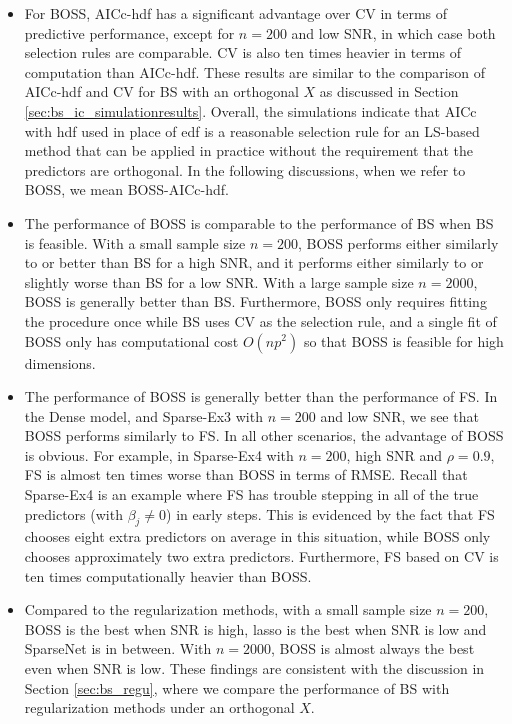 \begin{itemize}
	\item For BOSS, AICc-hdf has a significant advantage over CV in terms of predictive performance, except for $n=200$ and low SNR, in which case both selection rules are comparable. CV is also ten times heavier in terms of computation than AICc-hdf. These results are similar to the comparison of AICc-hdf and CV for BS with an orthogonal $X$ as discussed in Section \ref{sec:bs_ic_simulationresults}. Overall, the simulations indicate that AICc with hdf used in place of edf is a reasonable selection rule for an LS-based method that can be applied in practice without the requirement that the predictors are orthogonal. In the following discussions, when we refer to BOSS, we mean BOSS-AICc-hdf. 

	\item The performance of BOSS is comparable to the performance of BS when BS is feasible. With a small sample size $n=200$, BOSS performs either similarly to or better than BS for a high SNR, and it performs either similarly to or slightly worse than BS for a low SNR. With a large sample size $n=2000$, BOSS is generally better than BS. Furthermore, BOSS only requires fitting the procedure once while BS uses CV as the selection rule, and a single fit of BOSS only has computational cost $O(np^2)$ so that BOSS is feasible for high dimensions.

	\item The performance of BOSS is generally better than the performance of FS. In the Dense model, and Sparse-Ex3 with $n=200$ and low SNR, we see that BOSS performs similarly to FS. In all other scenarios, the advantage of BOSS is obvious. For example, in Sparse-Ex4 with $n=200$, high SNR and $\rho=0.9$, FS is almost ten times worse than BOSS in terms of RMSE. Recall that Sparse-Ex4 is an example where FS has trouble stepping in all of the true predictors (with $\beta_j \ne 0$) in early steps. This is evidenced by the fact that FS chooses eight extra predictors on average in this situation, while BOSS only chooses approximately two extra predictors. Furthermore, FS based on CV is ten times computationally heavier than BOSS. 

	\item Compared to the regularization methods, with a small sample size $n=200$, BOSS is the best when SNR is high, lasso is the best when SNR is low and SparseNet is in between. With $n=2000$, BOSS is almost always the best even when SNR is low. These findings are consistent with the discussion in Section \ref{sec:bs_regu}, where we compare the performance of BS with regularization methods under an orthogonal $X$. 


\end{itemize}
